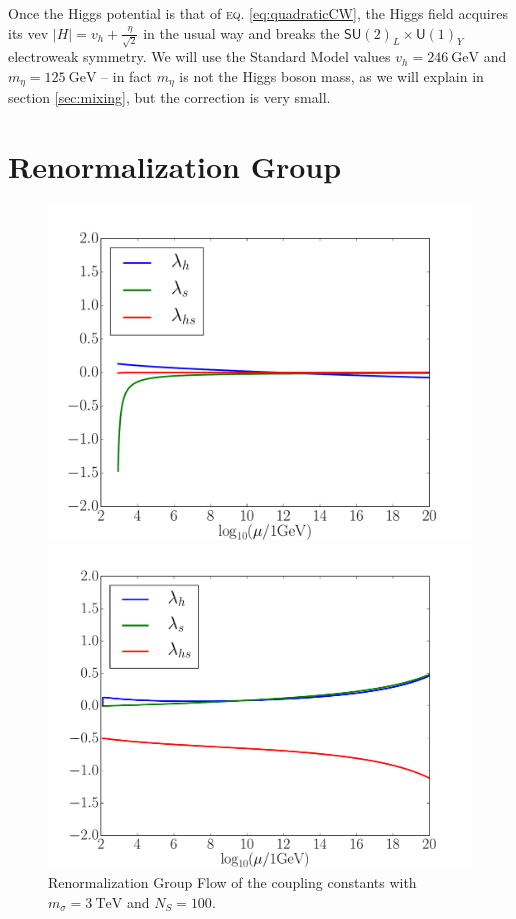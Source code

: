 \documentclass[aps,prd,preprintnumbers,nofootinbibn,twocolumn]{revtex4}
\begin{document}
Once the Higgs potential is that of \textsc{eq.} \eqref{eq:quadraticCW}, the Higgs field acquires its vev $|H| = v_h + \frac{\eta}{\sqrt{2}}$ in the usual way and breaks the $\mathsf{SU}(2)_L\times \mathsf{U}(1)_Y$ electroweak symmetry. We will use the Standard Model values $v_h = \SI{246}{\giga\electronvolt}$ and $m_\eta = \SI{125}{\giga\electronvolt}$ -- in fact $m_\eta$ is not the Higgs boson mass, as we will explain in section \ref{sec:mixing}, but the correction is very small.

\section{Renormalization Group}\label{sect:RG}
\begin{figure}[t]
\centering
\begin{minipage}[b]{0.49\textwidth}
\includegraphics[width=\columnwidth]{scenario1}
\caption{Renormalization Group Flow of the coupling constants with $m_\sigma = \SI{3}{\tera\electronvolt}$ and $N_S=100$.}\label{fig:sce1}
\end{minipage}
\hfill
\begin{minipage}[b]{0.49\textwidth}
\includegraphics[width=\columnwidth]{scenario2}

\end{minipage}
\end{figure}
\end{document}
